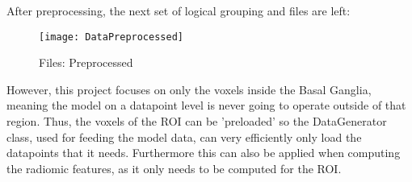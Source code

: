 After preprocessing, the next set of logical grouping and files are left:

\begin{figure}[H]
\centering
\texttt{[image: DataPreprocessed]}
\caption{Files: Preprocessed}
\end{figure}

However, this project focuses on only the voxels inside the Basal Ganglia, meaning the model on a datapoint level is never going to operate outside of that region. Thus, the voxels of the \ac{ROI} can be 'preloaded' so the DataGenerator class, used for feeding the model data, can very efficiently only load the datapoints that it needs. Furthermore this can also be applied when computing the radiomic features, as it only needs to be computed for the \ac{ROI}.




